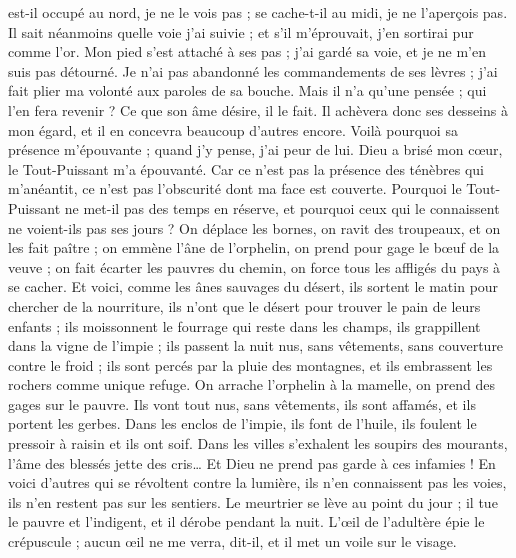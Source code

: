 \begin{multicols}{2}
est-il occupé au nord, je ne le vois pas ; se cache-t-il au midi, je ne l'aperçois pas.
Il sait néanmoins quelle voie j'ai suivie ; et s'il m'éprouvait, j'en sortirai pur comme l'or.
Mon pied s'est attaché à ses pas ; j'ai gardé sa voie, et je ne m'en suis pas détourné.
Je n'ai pas abandonné les commandements de ses lèvres ; j'ai fait plier ma volonté aux paroles de sa bouche.
Mais il n'a qu'une pensée ; qui l'en fera revenir ? Ce que son âme désire, il le fait.
Il achèvera donc ses desseins à mon égard, et il en concevra beaucoup d'autres encore.
Voilà pourquoi sa présence m'épouvante ; quand j'y pense, j'ai peur de lui.
Dieu a brisé mon cœur, le Tout-Puissant m'a épouvanté.
Car ce n'est pas la présence des ténèbres qui m'anéantit, ce n'est pas l'obscurité dont ma face est couverte.
\VerseOne{}Pourquoi le Tout-Puissant ne met-il pas des temps en réserve, et pourquoi ceux qui le connaissent ne voient-ils pas ses jours ?
On déplace les bornes, on ravit des troupeaux, et on les fait paître ;
on emmène l'âne de l'orphelin, on prend pour gage le bœuf de la veuve ;
on fait écarter les pauvres du chemin, on force tous les affligés du pays à se cacher.
Et voici, comme les ânes sauvages du désert, ils sortent le matin pour chercher de la nourriture, ils n'ont que le désert pour trouver le pain de leurs enfants ;
ils moissonnent le fourrage qui reste dans les champs, ils grappillent dans la vigne de l'impie ;
ils passent la nuit nus, sans vêtements, sans couverture contre le froid ;
ils sont percés par la pluie des montagnes, et ils embrassent les rochers comme unique refuge.
On arrache l'orphelin à la mamelle, on prend des gages sur le pauvre.
Ils vont tout nus, sans vêtements, ils sont affamés, et ils portent les gerbes.
Dans les enclos de l'impie, ils font de l'huile, ils foulent le pressoir à raisin et ils ont soif.
Dans les villes s'exhalent les soupirs des mourants, l'âme des blessés jette des cris… Et Dieu ne prend pas garde à ces infamies !
En voici d'autres qui se révoltent contre la lumière, ils n'en connaissent pas les voies, ils n'en restent pas sur les sentiers.
Le meurtrier se lève au point du jour ; il tue le pauvre et l'indigent, et il dérobe pendant la nuit.
L'œil de l'adultère épie le crépuscule ; aucun œil ne me verra, dit-il, et il met un voile sur le visage.

\end{multicols}
